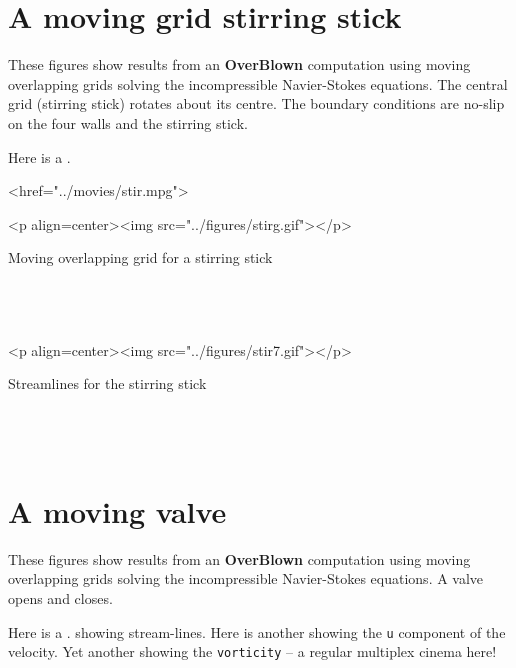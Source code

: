 \documentclass{article}
\begin{document}
\section{A moving grid stirring stick}

These figures show results from an {\bf OverBlown} computation using moving overlapping
grids solving the incompressible Navier-Stokes equations. The central
grid (stirring stick) rotates about its centre. The boundary conditions
are no-slip on the four walls and the stirring stick.

Here is a 
.

\begin{rawhtml}
<href="../movies/stir.mpg">
\end{rawhtml}


\begin{rawhtml}
<p align=center><img src="../figures/stirg.gif"></p>
\end{rawhtml}
\begin{flushleft}
{\LARGE Moving overlapping grid for a stirring stick} \\
~ \\   %
~ \\
~ \\
\end{flushleft}

\begin{rawhtml}
<p align=center><img src="../figures/stir7.gif"></p>
\end{rawhtml}
\begin{flushleft}
{\LARGE Streamlines for the stirring stick} \\
~ \\
~ \\
~ \\
\end{flushleft}

\section{A moving valve}

These figures show results from an {\bf OverBlown} computation using moving overlapping
grids solving the incompressible Navier-Stokes equations. A valve opens
and closes. 


Here is a 
.
showing stream-lines.
Here is another
showing the {\tt u} component of the velocity.
Yet another
showing the {\tt vorticity} -- a regular multiplex cinema here!
\end{document}

